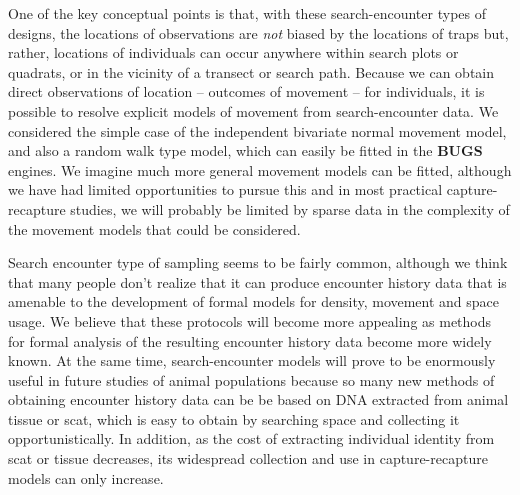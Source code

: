 One of the key conceptual points is that, with these search-encounter
types of designs, the locations of observations are {\it not} biased
by the locations of traps but, rather, locations of individuals can
occur anywhere within search plots or quadrats, or in the vicinity of
a transect or search path.  Because we can obtain direct observations
of location -- outcomes of movement -- for individuals, it is possible
to resolve explicit models of movement from search-encounter data.  We
considered the simple case of the independent bivariate normal
movement model, and also a random walk type model, which can easily be
fitted in the {\bf BUGS} engines.  We imagine much more general
movement models can be fitted, although we have had limited
opportunities to pursue this and in most practical capture-recapture
studies, we will probably be limited by sparse data in the complexity
of the movement models that could be considered.

Search encounter type of sampling seems to be fairly common, although
we think that many people don't realize that it can produce encounter
history data that is amenable to the development of formal models for
density, movement and space usage. We believe that these protocols
will become more appealing as methods for formal analysis of the
resulting encounter history data become more widely known.  At the
same time, search-encounter models will prove to be enormously useful
in future studies of animal populations because so many new methods of
obtaining encounter history data can be be based on DNA extracted from
animal tissue or scat, which is easy to obtain by searching space and
collecting it opportunistically.  In addition, as the cost of
extracting individual identity from scat or tissue decreases, its
widespread collection and use in capture-recapture models can only
increase.

